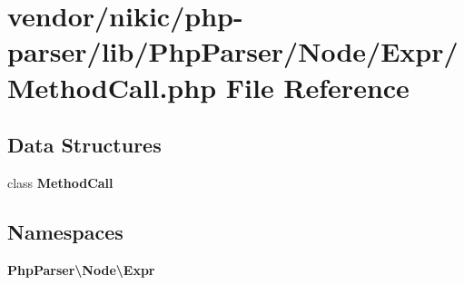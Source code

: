 \section{vendor/nikic/php-\/parser/lib/\+Php\+Parser/\+Node/\+Expr/\+Method\+Call.php File Reference}
\label{_method_call_8php}
\subsection*{Data Structures}
\begin{DoxyCompactItemize}
\item 
class {\bf Method\+Call}
\end{DoxyCompactItemize}
\subsection*{Namespaces}
\begin{DoxyCompactItemize}
\item 
 {\bf Php\+Parser\textbackslash{}\+Node\textbackslash{}\+Expr}
\end{DoxyCompactItemize}
